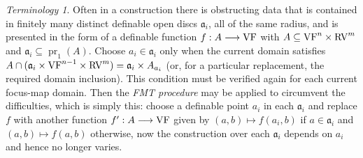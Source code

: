 \documentclass[12pt]{amsart}
\newcommand{\memph}[1]{{\color{magenta}\emph{#1}}}
\theoremstyle{plain}
\theoremstyle{definition}
\theoremstyle{remark}
\newtheorem{ter}[thm]{Terminology}
\numberwithin{equation}{section}
\theoremstyle{plain}
\newcommand{\VF}{\textup{VF}}
\newcommand{\RV}{\textup{RV}}
\DeclareMathOperator{\pr}{pr}
\newcommand{\ga}{\mathfrak{a}}
\newcommand{\0}{\emptyset}
\newcommand{\fun}{\longrightarrow}
\newcommand{\efun}{\longmapsto}
\newcommand{\sub}{\subseteq}
\begin{document}
\begin{ter}\label{FMT}
Often in a construction there is obstructing data that is contained in finitely many distinct definable open discs $\ga_i$, all of the same radius, and is presented in the form of a definable function $f : A \fun \VF$ with $A\sub\VF^n\times\RV^m$ and $\ga_i\sub\pr_1(A)$. Choose $a_i\in\ga_i$ only when the current domain satisfies $A\cap(\ga_i\times\VF^{n-1}\times\RV^m)=\ga_i\times A_{a_i}$ (or, for a particular replacement, the required domain inclusion). This condition must be verified again for each current focus-map domain. Then the \memph{FMT procedure} may be applied to circumvent the difficulties, which is simply this: choose a definable point $a_i$ in each $\ga_i$ and replace $f$ with another function $f' : A \fun \VF$ given by $(a,b) \efun f(a_i, b)$ if $a \in \ga_i$ and $(a,b) \efun f(a,b)$ otherwise, now the construction over each $\ga_i$ depends on $a_i$ and hence no longer varies.
\end{ter}
\end{document}
